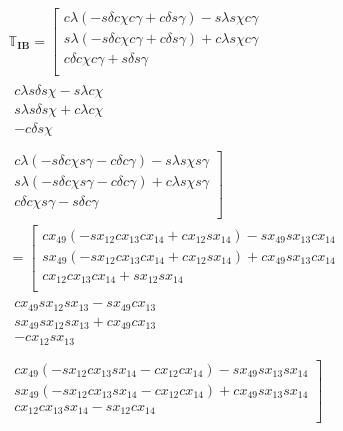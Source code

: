 \begin{multline} \label{eq:IBtrans}
\mathbb{T}_{\mathbf{IB}}=
\left[
\begin{matrix}
c\lambda\left(-s\delta c\chi c\gamma +c\delta s\gamma \right)-s\lambda s\chi c\gamma    \\
s\lambda\left(-s\delta c\chi c\gamma +c\delta s\gamma \right)+c\lambda s\chi c\gamma   \\
c\delta c\chi c\gamma +s\delta s\gamma    \\
\end{matrix}  \right.
\\
\begin{matrix}
c\lambda s\delta s\chi -s\lambda c\chi\\
s\lambda s\delta s\chi +c\lambda c\chi \\
 -c\delta s\chi \\
\end{matrix}
\\
\left.
\begin{matrix}
c\lambda\left(-s\delta c\chi s\gamma -c\delta c\gamma \right)-s\lambda s\chi s\gamma\\
s\lambda\left(-s\delta c\chi s\gamma -c\delta c\gamma \right)+c\lambda s\chi s\gamma \\
c\delta c\chi s\gamma -s\delta c\gamma\\
\end{matrix}
\right]\\
=
\left[
\begin{matrix}
cx_{49}\left(-sx_{12} cx_{13} cx_{14} +cx_{12} sx_{14} \right)-sx_{49} sx_{13} cx_{14}    \\
sx_{49}\left(-sx_{12} cx_{13} cx_{14} +cx_{12} sx_{14} \right)+cx_{49} sx_{13} cx_{14}    \\
cx_{12} cx_{13} cx_{14} +sx_{12} sx_{14}   \\
\end{matrix} \right.
\\
\begin{matrix}
cx_{49} sx_{12} sx_{13} -sx_{49} cx_{13} \\
sx_{49} sx_{12} sx_{13} +cx_{49} cx_{13} \\
-cx_{12} sx_{13} \\
\end{matrix}
\\
\left.
\begin{matrix}
cx_{49}\left(-sx_{12} cx_{13} sx_{14} -cx_{12} cx_{14} \right)-sx_{49} sx_{13} sx_{14} \\
sx_{49}\left(-sx_{12} cx_{13} sx_{14} -cx_{12} cx_{14} \right)+cx_{49} sx_{13} sx_{14} \\
 cx_{12} cx_{13} sx_{14} -sx_{12} cx_{14} \\
\end{matrix}
\right]\\
\end{multline}


